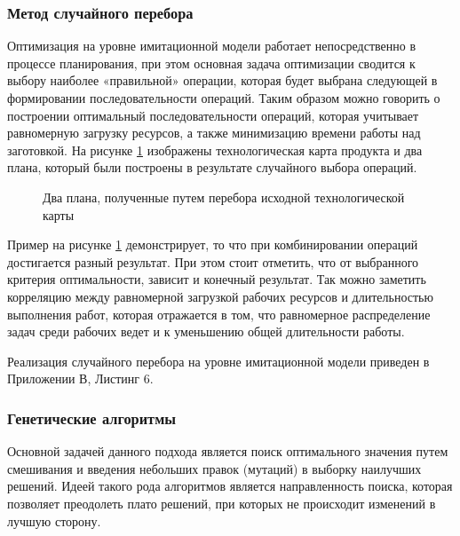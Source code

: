 \subsubsection*{Метод случайного перебора}
Оптимизация на уровне имитационной модели работает непосредственно в процессе планирования, при этом основная задача оптимизации сводится к выбору наиболее «правильной» операции, которая будет выбрана следующей в формировании последовательности операций. Таким образом можно говорить о построении оптимальный последовательности операций, которая учитывает равномерную загрузку ресурсов, а также минимизацию времени работы над заготовкой. На рисунке \ref{ris:Force} изображены технологическая карта продукта и два плана, который были построены в результате случайного выбора операций.

\begin{figure}[H]
    \caption{Два плана, полученные путем перебора исходной технологической карты}
    \label{ris:Force}
\end{figure}

Пример на рисунке \ref{ris:Force} демонстрирует, то что при комбинировании операций достигается разный результат. При этом стоит отметить, что от выбранного критерия оптимальности, зависит и конечный результат. Так можно заметить корреляцию между равномерной загрузкой рабочих ресурсов и длительностью выполнения работ, которая отражается в том, что равномерное распределение задач среди рабочих ведет и к уменьшению общей длительности работы.

Реализация случайного перебора на уровне имитационной модели приведен в Приложении В, Листинг 6.

\subsubsection*{Генетические алгоритмы}
Основной задачей данного подхода является поиск оптимального значения путем смешивания и введения небольших правок (мутаций) в выборку наилучших решений.
Идеей такого рода алгоритмов является направленность поиска, которая позволяет преодолеть плато решений, при которых не происходит изменений в лучшую сторону. 


